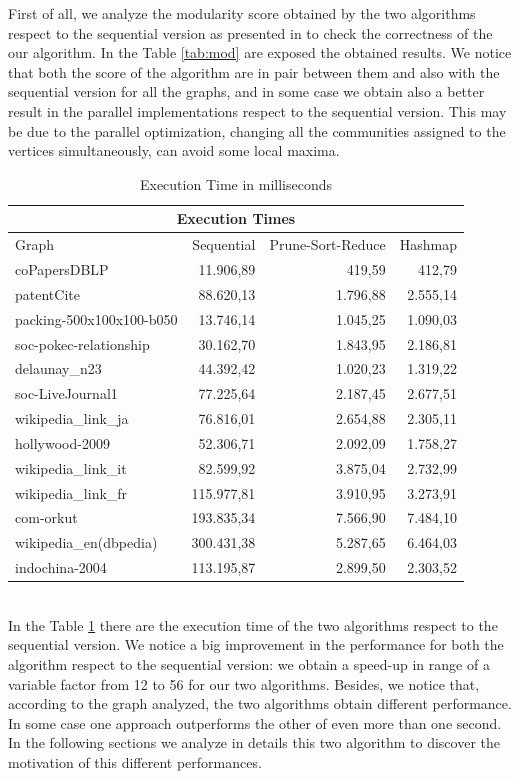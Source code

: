 First of all, we analyze the modularity score obtained by the two algorithms respect to the sequential version as presented in \cite{Blondel_2008} to check the correctness of the our algorithm. In the Table \ref{tab:mod} are exposed the obtained results. We notice that both the score of the algorithm are in pair between them and also with the sequential version for all the graphs, and in some case we obtain also a better result in the parallel implementations respect to the sequential version. This  may be due to the parallel optimization, changing all the communities assigned to the vertices simultaneously, can avoid some local maxima.
\begin{table}
	\centering
	\begin{tabular}{ |l||r||r|r|}
		\hline
		\multicolumn{4}{|c|}{Execution Times} \\
		\hline
		Graph & Sequential & Prune-Sort-Reduce & Hashmap \\
		\hline
		coPapersDBLP 			&  11.906,89 &   419,59 &  412,79 \\
		patentCite 				&  88.620,13 & 1.796,88 & 2.555,14 \\
		packing-500x100x100-b050&  13.746,14 & 1.045,25 & 1.090,03 \\
		soc-pokec-relationship	&  30.162,70 & 1.843,95 & 2.186,81 \\ 
		delaunay\_n23 			&  44.392,42 & 1.020,23 & 1.319,22 \\
		soc-LiveJournal1 		&  77.225,64 & 2.187,45 & 2.677,51 \\
		wikipedia\_link\_ja 	&  76.816,01 & 2.654,88 & 2.305,11 \\
		hollywood-2009 			&  52.306,71 & 2.092,09 & 1.758,27 \\
		wikipedia\_link\_it 	&  82.599,92 & 3.875,04 & 2.732,99 \\
		wikipedia\_link\_fr 	& 115.977,81 & 3.910,95 & 3.273,91 \\
		com-orkut 				& 193.835,34 & 7.566,90 & 7.484,10 \\
		wikipedia\_en(dbpedia) 	& 300.431,38 & 5.287,65 & 6.464,03 \\
		indochina-2004 			& 113.195,87 & 2.899,50 & 2.303,52 \\
		\hline
	\end{tabular}
	\caption{\label{tab:execution_time}Execution Time in milliseconds}
\end{table} \\
In the Table \ref{tab:execution_time} there are the execution time of the two algorithms respect to the sequential version. We notice a big improvement in the performance for both the algorithm respect to the sequential version: we obtain a speed-up in range of a variable factor from 12 to 56 for our two algorithms. 
Besides, we notice that, according to the graph analyzed, the two algorithms obtain different performance. In some case one approach outperforms the other of even more than one second. In the following sections we analyze in details this two algorithm to discover the motivation of this different performances.  
